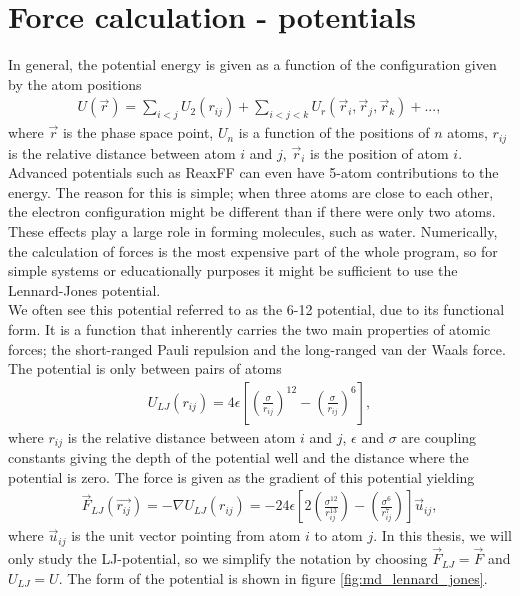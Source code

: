 \section{Force calculation - potentials}
In general, the potential energy is given as a function of the configuration given by the atom positions
\begin{align}
	U(\vec{r}) = \sum_{i<j}U_2(r_{ij}) + \sum_{i<j<k} U_r(\vec r_i, \vec r_j, \vec r_k) + ...,
\end{align}
where $\vec r$ is the phase space point, $U_n$ is a function of the positions of $n$ atoms, $r_{ij}$ is the relative distance between atom $i$ and $j$, $\vec r_i$ is the position of atom $i$. Advanced potentials such as ReaxFF can even have 5-atom contributions to the energy\cite{van2001reaxff}. The reason for this is simple; when three atoms are close to each other, the electron configuration might be different than if there were only two atoms. These effects play a large role in forming molecules, such as water. Numerically, the calculation of forces is the most expensive part of the whole program, so for simple systems or educationally purposes it might be sufficient to use the Lennard-Jones potential.\\
We often see this potential referred to as the 6-12 potential, due to its functional form. It is a function that inherently carries the two main properties of atomic forces; the short-ranged Pauli repulsion and the long-ranged van der Waals force. The potential is only between pairs of atoms
\begin{align}
	\label{eq:md_potential_energy}
	U_{LJ}(r_{ij}) = 4\epsilon\left[\left(\frac{\sigma}{r_{ij}}\right)^{12} - \left(\frac{\sigma}{r_{ij}}\right)^{6}\right],
\end{align}
where $r_{ij}$ is the relative distance between atom $i$ and $j$, $\epsilon$ and $\sigma$ are coupling constants giving the depth of the potential well and the distance where the potential is zero. The force is given as the gradient of this potential yielding 
\begin{align}
	\label{eq:md_lj_force}
	\vec F_{LJ}(\vec{r_{ij}}) = -\nabla U_{LJ}(r_{ij}) = -24\epsilon\left[2\left(\frac{\sigma^{12}}{r_{ij}^{13}}\right) - \left(\frac{\sigma^6}{r_{ij}^7}\right)\right]\vec u_{ij},
\end{align}
where $\vec u_{ij}$ is the unit vector pointing from atom $i$ to atom $j$. In this thesis, we will only study the LJ-potential, so we simplify the notation by choosing $\vec F_{LJ} = \vec F$ and $U_{LJ} = U$. The form of the potential is shown in figure \ref{fig:md_lennard_jones}.
